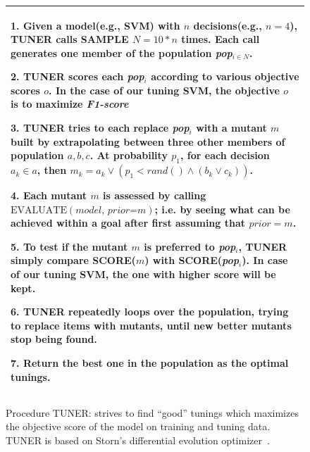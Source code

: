 \documentclass[sigconf,review, anonymous]{acmart}
\theoremstyle{break}
\begin{document}
  \begin{figure}[!t]\small
     \begin{tabular}{|p{.95\linewidth}|}\hline
      1. Given a model(e.g., SVM) with $n$ decisions(e.g., $n=4$),
      TUNER calls SAMPLE $N=10*n$ times.
      Each call generates one member of the population {\em pop$_{i\in N}$}.

      2. TUNER scores each {\em pop}$_i$ according to various objective
      scores $o$. In the case of our tuning SVM, the objective $o$ is to maximize
      {\it F1-score}

     3. TUNER tries to each replace {\em pop}$_i$ with a mutant $m$
     built by extrapolating between three other members of population $a,b,c$.
     At probability $p_1$, for each decision $a_k \in a$, then
     $m_k= a_k \vee (p_1 < \mathit{rand}() \wedge( b_k \vee c_k))$.

     4. Each mutant $m$ is assessed by calling  $\text{EVALUATE}(\textit{model, prior=m})$;
     i.e. by seeing what can be achieved within a goal after first assuming
     that $\textit{prior}=m$.

     5. To test if the mutant $m$ is preferred to {\em pop}$_i$, TUNER simply
      compare SCORE($m$) with SCORE({\em pop}$_i$). In case of our tuning SVM,
      the one with higher score will be kept.

    6. TUNER repeatedly loops over the population, trying to replace  items with mutants, until new better mutants stop being found.

    7. Return the best one in the population as the optimal tunings.
    \\\hline
    \end{tabular}
    \caption{Procedure TUNER: strives to find ``good'' tunings which maximizes
     the objective score of the model on training and tuning data. TUNER is based on Storn's differential evolution optimizer~\cite{storn1997differential}.}
    \label{fig:optimize}
\end{figure}

\end{document}
